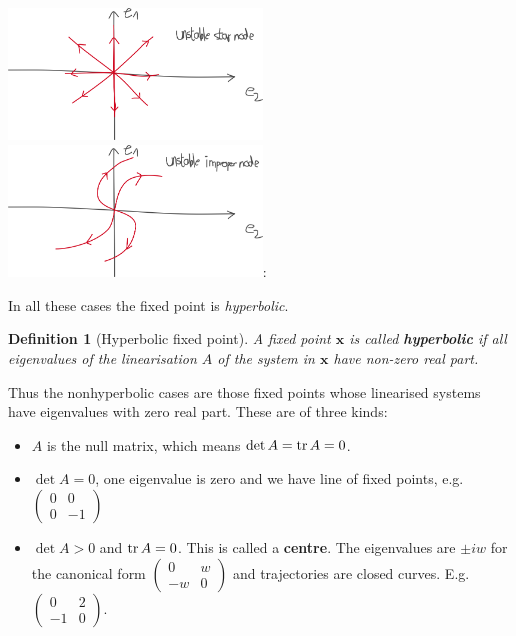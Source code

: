 \documentclass[hidelinks,a4paper, 11pt]{article}
\theoremstyle{plain}
\theoremstyle{break}
\theoremstyle{plain}
\newtheorem{definition}[theorem]{Definition}
\theoremstyle{definition}
\begin{document}
\begin{itemize}
		\includegraphics*[height=3.5cm]{unstable_stellar.png}
		\includegraphics*[height=3.5cm]{improper_node.png}:
\end{itemize}

In all these cases the fixed point is \emph{hyperbolic}.

\begin{definition}[Hyperbolic fixed point]
	A fixed point $\mathbf x$ is called \textbf{hyperbolic} if all eigenvalues of the linearisation $A$ of the system in $\mathbf x$ have non-zero real part.
\end{definition}

Thus the nonhyperbolic cases are those fixed points whose linearised systems have eigenvalues with zero real part. These are of three kinds:
\begin{itemize}
	\item $A$ is the null matrix, which means $\det A = \tr A = 0$.
	\item $\det A = 0$, one eigenvalue is zero and we have line of fixed points, e.g. $\begin{pmatrix}
		0 & 0 \\ 0 & -1
	\end{pmatrix}$
	\item $\det A > 0$ and $\tr A = 0$. This is called a \textbf{centre}. The eigenvalues are $\pm iw$ for the canonical form $\begin{pmatrix}
		0 & w \\ -w & 0
	\end{pmatrix}$ and trajectories are closed curves. E.g. $\begin{pmatrix}
	0 & 2 \\ -1 & 0
	\end{pmatrix}$. 
\end{itemize}
\end{document}
